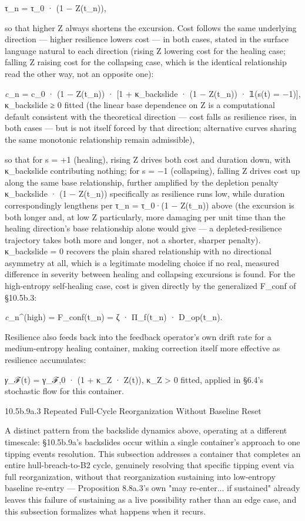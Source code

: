 \documentclass[
]{article}
\begin{document}
τ\_n = τ\_0 · (1 − Z(t\_n)),

so that higher Z always shortens the excursion. Cost follows the same
underlying direction --- higher resilience lowers cost --- in both
cases, stated in the surface language natural to each direction (rising
Z lowering cost for the healing case; falling Z raising cost for the
collapsing case, which is the identical relationship read the other way,
not an opposite one):

\emph{c}\_n = c\_0 · (1 − Z(t\_n)) · {[}1 + κ\_backslide · (1 − Z(t\_n))
· 𝟙(s(t) = −1){]}, κ\_backslide ≥ 0 fitted (the linear base dependence
on Z is a computational default consistent with the theoretical
direction --- cost falls as resilience rises, in both cases --- but is
not itself forced by that direction; alternative curves sharing the same
monotonic relationship remain admissible),

so that for s = +1 (healing), rising Z drives both cost and duration
down, with κ\_backslide contributing nothing; for s = −1 (collapsing),
falling Z drives cost up along the same base relationship, further
amplified by the depletion penalty κ\_backslide · (1 − Z(t\_n))
specifically as resilience runs low, while duration correspondingly
lengthens per τ\_n = τ\_0·(1 − Z(t\_n)) above (the excursion is both
longer and, at low Z particularly, more damaging per unit time than the
healing direction's base relationship alone would give --- a
depleted-resilience trajectory takes both more and longer, not a
shorter, sharper penalty). κ\_backslide = 0 recovers the plain shared
relationship with no directional asymmetry at all, which is a legitimate
modeling choice if no real, measured difference in severity between
healing and collapsing excursions is found. For the high-entropy
self-healing case, cost is given directly by the generalized F\_conf of
§10.5b.3:

\emph{c}\_n\^{}(high) = F\_conf(t\_n) = ζ · Π\_f(t\_n) · D\_op(t\_n).

Resilience also feeds back into the feedback operator's own drift rate
for a medium-entropy healing container, making correction itself more
effective as resilience accumulates:

\emph{γ}\_ℱ(t) = γ\_ℱ,0 · (1 + κ\_Z · Z(t)), κ\_Z \textgreater{} 0
fitted, applied in §6.4's stochastic flow for this container.

10.5b.9a.3 Repeated Full-Cycle Reorganization Without Baseline Reset

A distinct pattern from the backslide dynamics above, operating at a
different timescale: §10.5b.9a's backslides occur within a single
container's approach to one tipping events resolution. This subsection
addresses a container that completes an entire hull-breach-to-B2 cycle,
genuinely resolving that specific tipping event via full reorganization,
without that reorganization sustaining into low-entropy baseline
re-entry --- Proposition 8.8a.3's own "may re-enter... if sustained"
already leaves this failure of sustaining as a live possibility rather
than an edge case, and this subsection formalizes what happens when it
recurs.
\end{document}
